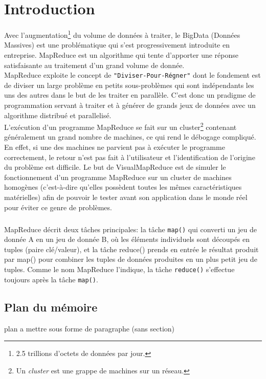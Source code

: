 \chapter*{Introduction}
Avec l'augmentation\footnote{2.5 trillions d'octets de données par jour.} du volume de données à traiter, le BigData (Données Massives) est une problématique qui s'est progressivement introduite en entreprise.\cite{JoliaFerrierBigData} MapReduce est un algorithme qui tente d'apporter une réponse satisfaisante au traitement d'un grand volume de donnée. \\

MapReduce exploite le concept de {\tt "Diviser-Pour-Régner"} dont le fondement est de diviser un large problème en petits sous-problèmes qui sont indépendants les uns des autres dans le but de les traiter en parallèle\cite{mapReduceTextProcessing}. C'est donc un pradigme de programmation servant à traiter et à générer de grands jeux de données avec un algorithme distribué et parallelisé.\\

L'exécution d'un programme MapReduce se fait sur un cluster\footnote{Un \textit{cluster} est une grappe de machines sur un réseau.} contenant généralement un grand nombre de machines, ce qui rend le débogage compliqué. En effet, si une des machines ne parvient pas à exécuter le programme correctement, le retour n'est pas fait à l'utilisateur et l'identification de l'origine du problème est difficile.
Le but de VisualMapReduce est de simuler le fonctionnement d'un programme MapReduce sur un cluster de machines homogènes (c'est-à-dire qu'elles possèdent toutes les mêmes caractéristiques matérielles) afin de pouvoir le tester avant son application dans le monde réel pour éviter ce genre de problèmes.

\paragraph{}

 MapReduce \cite{Bdpedia} décrit deux tâches principales: la tâche {\tt map()} qui converti un jeu de donnée A en un jeu de donnée B, où les éléments individuels sont découpés en tuples (paire clé/valeur), et la tâche reduce() prends en entrée le résultat produit par map() pour combiner les tuples de données produites en un plus petit jeu de tuples.
Comme le nom MapReduce l'indique, la tâche {\tt reduce()} s'effectue toujours après la tâche {\tt map()}.
\paragraph{}

\section*{Plan du mémoire}
plan a mettre sous forme de paragraphe (sans section)